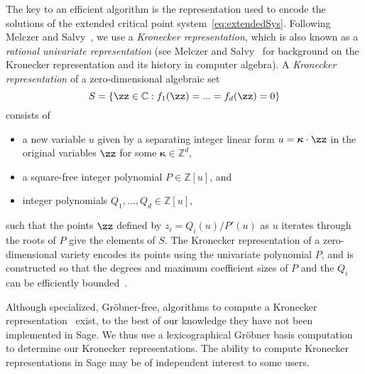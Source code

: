 \documentclass[a4paper]{amsart}
\theoremstyle{definition}
\newcommand{\Z}{{\mathbb Z}}
\begin{document}
The key to an efficient algorithm is the representation used to encode the solutions of the extended critical point system~\eqref{eq:extendedSys}. Following Melczer and Salvy~\cite{MelczerSalvy2021}, we use a \emph{Kronecker representation}, which is also known as a \emph{rational univariate representation} (see Melczer and Salvy~\cite{MelczerSalvy2021} for background on the Kronecker representation and its history in computer algebra). A \emph{Kronecker representation} of a zero-dimensional algebraic set 
\[ S = \{\zz \in \mathbb{C} : f_1(\zz) = ... = f_d(\zz) = 0\}\] 
consists of
\begin{itemize}
    \item a new variable $u$ given by a separating integer linear form 
    $u = \boldsymbol{\kappa} \cdot \zz$ in the original variables $\zz$ for some $\boldsymbol{\kappa}\in \mathbb{Z}^d$,
    \item a square-free integer polynomial $P \in \Z[u]$, and
    \item integer polynomials $Q_1, ..., Q_d \in \Z[u]$,
\end{itemize}
such that the points $\zz$ defined by $z_i=Q_i(u)/P'(u)$ as $u$ iterates through the roots of $P$ give the elements of $S$. The Kronecker representation of a zero-dimensional variety encodes its points using the univariate polynomial $P$, and is constructed so that the degrees and maximum coefficient sizes of $P$ and the $Q_i$ can be efficiently bounded~\cite{Safey-El-DinSchost2018,Schost2001}.

Although specialized, Gröbner-free, algorithms to compute a Kronecker representation~\cite{GiustiLecerfSalvy2001} exist, to the best of our knowledge they have not been implemented in Sage. We thus use a lexicographical Gröbner basis computation to determine our Kronecker representations. The ability to compute Kronecker representations in Sage may be of independent interest to some users.
\end{document}
